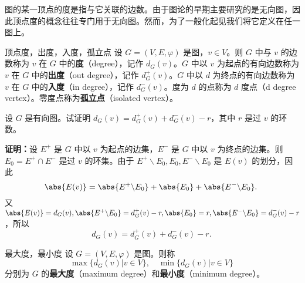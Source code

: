 

图的某一顶点的度是指与它关联的边数。由于图论的早期主要研究的是无向图，因此顶点度的概念往往专门用于无向图。然而，为了一般化起见我们将它定义在任一图上。

\begin{definition}{顶点度，出度，入度，孤立点}
设 $G=(V,E,\varphi)$ 是图，$v\in V$。则 $G$ 中与 $v$ 的边数称为 $v$ 在 $G$ 中的\textbf{度}（degree），记作 $d_G(v)$。$G$ 中以 $v$ 为起点的有向边数称为 $v$ 在 $G$ 中的\textbf{出度}（out degree），记作 $d_G^+(v)$。$G$ 中以 $d$ 为终点的有向边数称为 $v$ 在 $G$ 中的\textbf{入度}（in degree），记作 $d_G^-(v)$。度为 $d$ 的点称为 $d$ 度点（d degree vertex）。零度点称为\textbf{孤立点}（isolated vertex）。
\end{definition}

\begin{example}{}
设 $G$ 是有向图。试证明 $d_G(v)=d_G^+(v)+d_G^-(v)-r$，其中 $r$ 是过 $v$ 的环数。

\textbf{证明：}设 $E^+$ 是 $G$ 中以 $v$ 为起点的边集，$E^-$ 是 $G$ 中以 $v$ 为终点的边集。则 $E_0=E^+\cap E^-$ 是过 $v$ 的环集。由于
$E^+\backslash E_0, E_0, E^-\backslash E_0$ 是 $E(v)$ 的划分，因此
\begin{equation}
\abs{E(v)}=\abs{E^+\backslash E_0}+\abs{E_0}+\abs{E^-\backslash E_0}.~
\end{equation}
又 $\abs{E(v)}=d_G(v),\abs{E^+\backslash E_0}=d_G^+(v)-r, \abs{E_0}=r, \abs{E^-\backslash E_0}=d_G^-(v)-r$，所以
\begin{equation}
d_G(v)=d_G^+(v)+d_G^-(v)-r.~
\end{equation}
\end{example}

\begin{definition}{最大度，最小度}
设 $G=(V,E,\varphi)$ 是图。则称
\begin{equation}
\max\{d_G(v)|v\in V\},\quad \min\{d_G(v)|v\in V\}~
\end{equation}
分别为 $G$ 的\textbf{最大度}（maximum degree）和\textbf{最小度}（minimum degree）。
\end{definition}






